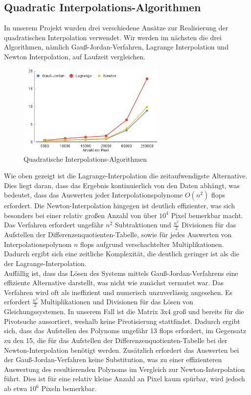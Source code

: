 \documentclass[course=erap]{aspdoc}
\begin{document}
\subsection{Quadratic Interpolations-Algorithmen}
In unserem Projekt wurden drei verschiedene Ansätze zur Realisierung der quadratischen Interpolation verwendet. Wir werden im nächsten die drei Algorithmen, nämlich Gauß-Jordan-Verfahren, Lagrange Interpolation und Newton Interpolation, auf Laufzeit vergleichen. 
\begin{figure}[H]
  \centering
  \includegraphics[width=0.65\textwidth]{quadAlg.png}
  \caption{Quadratische Interpolations-Algorithmen}
  \label{fig:quadalg}
\end{figure}
Wie oben gezeigt ist die Lagrange-Interpolation die zeitaufwendigste Alternative. Dies liegt daran, dass das Ergebnis kontinuierlich von den Daten abhängt, was bedeutet, dass das Auswerten jeder Interpolationspolynome $O(n^2)$ flops erfordert.
Die Newton-Interpolation hingegen ist deutlich effizienter, was sich besonders bei einer relativ großen Anzahl von über $10^4$ Pixel bemerkbar macht. Das Verfahren erfordert ungefähr $n^2$ Subtraktionen und $\frac{n^2}{2}$ Divisionen für das Aufstellen der Differenzenquotienten-Tabelle, sowie für jedes Auswerten von  Interpolationspolynom $n$ flops aufgrund verschachtelter Multiplikationen. Dadurch ergibt sich eine zeitliche Komplexität, die deutlich geringer ist als die der Lagrange-Interpolation. \\
Auffällig ist, dass das Lösen des Systems mittels Gauß-Jordan-Verfahrens eine effiziente Alternative darstellt, was nicht wie zunächst vermutet war. Das Verfahren wird oft als ineffizient und numerisch unzuverlässig angesehen. Es erfordert $\frac{n^3}{2}$ Multiplikationen und Divisionen für das Lösen von Gleichungssystemen. In unserem Fall ist die Matrix 3x4 groß und bereits für die Pivotsuche aussortiert, weshalb keine Pivotisierung stattfindet. Dadurch ergibt sich, dass das Aufstellen des Polynoms ungefähr 13 flops erfordert, im Gegensatz zu den 15, die für das Aufstellen der Differenzenquotienten-Tabelle bei der Newton-Interpolation benötigt werden. Zusätzlich erfordert das Auswerten bei der Gauß-Jordan-Verfahren keine Substitution, was zu einer effizienteren Auswertung des resultierenden Polynoms im Vergleich zur Newton-Interpolation führt.
Dies ist für eine relativ kleine Anzahl an Pixel kaum spürbar, wird jedoch ab etwa $10^6$ Pixeln bemerkbar.
\end{document}
